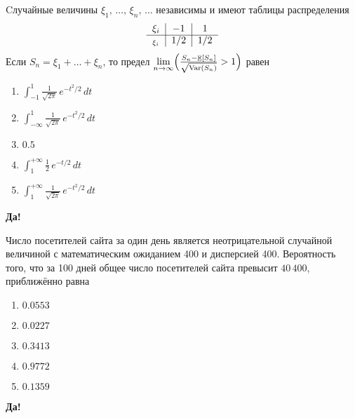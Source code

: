 \documentclass[t]{beamer}
\DeclareMathOperator{\Var}{Var}
\DeclareMathOperator{\E}{\mathbb{E}}
\let\P\relax
\DeclareMathOperator{\P}{\mathbb{P}}
\begin{document}
 \begin{frame} \label{17-Yes} 
\begin{block}{17} 

    Cлучайные величины $\xi_1, \, \ldots, \, \xi_n, \, \ldots$ независимы и имеют таблицы распределения
    \[
    \begin{tabular}{c|c|c}
      $\xi_i$                     & $-1$   & $1$   \\ \cline{1-3}
      $\P_{\xi_i}$        & $1/2$       & $1/2$   \\
    \end{tabular}
    \]
    Если $S_n = \xi_1 + \ldots + \xi_n$, то предел $\lim\limits_{n \rightarrow \infty}\P\Bigl(\frac{S_n - \E[S_n]}{\sqrt{\Var(S_n)}} > 1\Bigr)$ равен
  


 \end{block} 
\begin{enumerate} 
\item[] \hyperlink{17-No}{\beamergotobutton{} $\int_{-1}^{1}\frac{1}{\sqrt{2\pi}}\,e^{-t^2/2}\,dt$}
\item[] \hyperlink{17-No}{\beamergotobutton{} $\int_{-\infty}^{1}\frac{1}{\sqrt{2\pi}}\,e^{-t^2/2}\,dt$}
\item[] \hyperlink{17-No}{\beamergotobutton{} $0.5$}
\item[] \hyperlink{17-No}{\beamergotobutton{} $\int_{1}^{+\infty}\frac{1}{2}\,e^{-t/2}\,dt$}
\item[] \hyperlink{17-Yes}{\beamergotobutton{} $\int_{1}^{+\infty}\frac{1}{\sqrt{2\pi}}\,e^{-t^2/2}\,dt$}
\end{enumerate} 

 \textbf{Да!} 
 \hyperlink{18}{}\end{frame} 


 \begin{frame} \label{18-Yes} 
\begin{block}{18} 

  Число посетителей сайта за один день является неотрицательной случайной величиной с математическим ожиданием 400 и дисперсией 400. Вероятность того, что за 100 дней общее число посетителей сайта превысит $40\,400$, приближённо равна
  


 \end{block} 
\begin{enumerate} 
\item[] \hyperlink{18-No}{\beamergotobutton{} $0.0553$}
\item[] \hyperlink{18-Yes}{\beamergotobutton{} $0.0227$}
\item[] \hyperlink{18-No}{\beamergotobutton{} $0.3413$}
\item[] \hyperlink{18-No}{\beamergotobutton{} $0.9772$}
\item[] \hyperlink{18-No}{\beamergotobutton{} $0.1359$}
\end{enumerate} 

 \textbf{Да!} 
 \hyperlink{19}{}\end{frame} 
\end{document}
